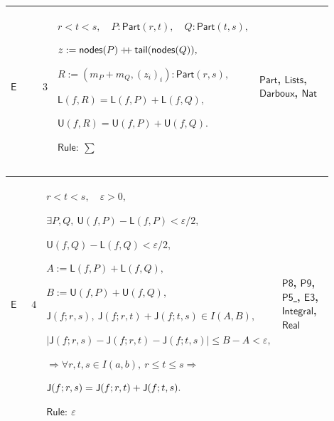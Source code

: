 \documentclass[12pt,reqno]{amsart}
\theoremstyle{blueplain}
\numberwithin{equation}{section}
\begin{document}
{\scriptsize \setlength{\parskip}{0pt}\nointerlineskip
\noindent 
\begin{tabular}{|@{}>{\centering\arraybackslash}m{0.10658\linewidth}|>{\centering\arraybackslash}m{0.03553\linewidth}|>{\centering\arraybackslash}m{0.52105\linewidth}|>{\centering\arraybackslash}m{0.23684\linewidth}|}
\hline
\hypertarget{proof:E3}{$\displaystyle \mathsf{E}$} & $\displaystyle 3$ & $%
\displaystyle r<t<s,\quad P:\mathsf{Part}(r,t),\quad Q:\mathsf{Part}(t,s),$%
\par$\displaystyle z:=\mathsf{nodes}(P)\mathbin{+\!\!+}\mathsf{tail}(\mathsf{%
nodes}(Q)),$\par$\displaystyle R:=(m_P+m_Q,(z_i)_i):\mathsf{Part}(r,s),$\par$%
\displaystyle \mathsf{L}(f,R)=\mathsf{L}(f,P)+\mathsf{L}(f,Q),$\par$%
\displaystyle \mathsf{U}(f,R)=\mathsf{U}(f,P)+\mathsf{U}(f,Q).$\par$%
\displaystyle \mathsf{Rule}:\ \sum$ & \hyperlink{def:Part}{$\displaystyle 
\mathsf{Part}$}, \hyperlink{def:Lists}{$\displaystyle \mathsf{Lists}$}, 
\hyperlink{def:Darboux}{$\displaystyle \mathsf{Darboux}$}, \hyperlink{ax:Nat}%
{$\displaystyle \mathsf{Nat}$} \\ \hline
\end{tabular}%
}

{\scriptsize \setlength{\parskip}{0pt}\nointerlineskip
\noindent 
\begin{tabular}{|@{}>{\centering\arraybackslash}m{0.10658\linewidth}|>{\centering\arraybackslash}m{0.03553\linewidth}|>{\centering\arraybackslash}m{0.52105\linewidth}|>{\centering\arraybackslash}m{0.23684\linewidth}|}
\hline
\hypertarget{proof:E4}{$\displaystyle \mathsf{E}$} & $\displaystyle 4$ & $%
\displaystyle r<t<s,\quad\varepsilon>0,$\par$\displaystyle \exists P,Q,\ 
\mathsf{U}(f,P)-\mathsf{L}(f,P)<\varepsilon/2,$\par$\displaystyle \mathsf{U}%
(f,Q)-\mathsf{L}(f,Q)<\varepsilon/2,$\par$\displaystyle A:=\mathsf{L}(f,P)+%
\mathsf{L}(f,Q),$\par$\displaystyle B:=\mathsf{U}(f,P)+\mathsf{U}(f,Q),$\par$%
\displaystyle \mathsf{J}(f;r,s),\ \mathsf{J}(f;r,t)+\mathsf{J}(f;t,s)\in
I(A,B),$\par$\displaystyle |\mathsf{J}(f;r,s)-\mathsf{J}(f;r,t)-\mathsf{J}%
(f;t,s)|\le B-A<\varepsilon,$\par$\displaystyle \Rightarrow\forall r,t,s\in
I(a,b),\ r\le t\le s\Rightarrow$\par$\displaystyle \mathsf{J}(f;r,s)=\mathsf{%
J}(f;r,t)+\mathsf{J}(f;t,s).$\par$\displaystyle \mathsf{Rule}:\ \varepsilon$
& \hyperlink{proof:P8}{$\displaystyle \mathsf{P8}$}, \hyperlink{proof:P9}{$%
\displaystyle \mathsf{P9}$}, \hyperlink{proof:P5}{$\displaystyle \mathsf{P5}$%
}, \hyperlink{proof:E3}{$\displaystyle \mathsf{E3}$}, \hyperlink{def:Integral}%
{$\displaystyle \mathsf{Integral}$}, \hyperlink{ax:Real}{$\displaystyle 
\mathsf{Real}$} \\ \hline
\end{tabular}%
}
\end{document}
